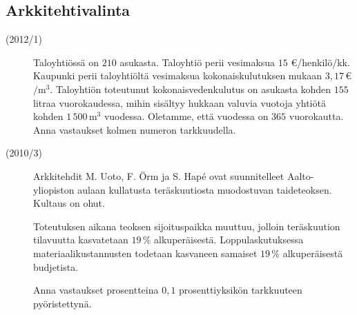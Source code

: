 \subsection*{Arkkitehtivalinta}


\begin{description}
    \item[(2012/1)] Taloyhtiössä on $210$ asukasta. Taloyhtiö perii vesimaksua $15$ \euro/henkilö/kk. Kaupunki perii taloyhtiöltä vesimaksua kokonaiskulutuksen mukaan $3,17$\,\euro $/ \mathrm{m}^3$. Taloyhtiön toteutunut kokonaisvedenkulutus on asukasta kohden $155$ litraa vuorokaudessa, mihin sisältyy hukkaan valuvia vuotoja yhtiötä kohden $1\,500\,\mathrm{m}^3$ vuodessa. Oletamme, että vuodessa on $365$ vuorokautta.    
    Anna vastaukset kolmen numeron tarkkuudella.
\end{description}


\begin{description}
    \item[(2010/3)] Arkkitehdit M. Uoto, F. Örm ja S. Hapé ovat suunnitelleet Aalto-yliopiston aulaan kullatusta teräskuutiosta muodostuvan taideteoksen. Kultaus on ohut.
    
    Toteutuksen aikana teoksen sijoituspaikka muuttuu, jolloin teräskuution tilavuutta kasvatetaan $19$\,\% alkuperäisestä. Loppulaskutuksessa materiaalikustannusten todetaan kasvaneen samaiset $19$\,\% alkuperäisestä budjetista.                   
    
    Anna vastaukset prosentteina $0,1$ prosenttiyksikön tarkkuuteen pyöristettynä.
\end{description}

